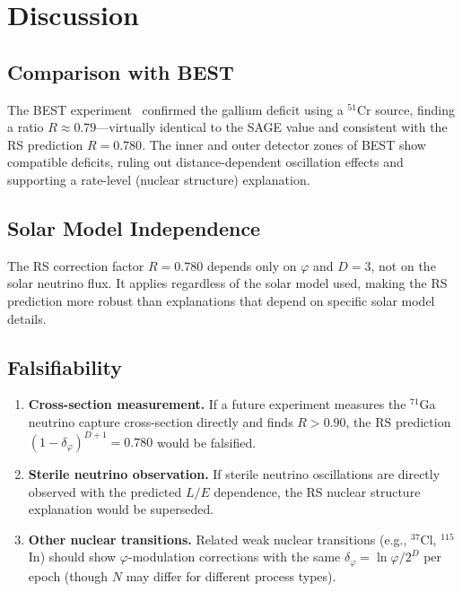 \documentclass[12pt,a4paper]{article}
\theoremstyle{definition}
\theoremstyle{remark}
\begin{document}
\section{Discussion}
\label{sec:discuss}

\subsection{Comparison with BEST}

The BEST experiment~\cite{BEST2022} confirmed the gallium deficit using
a $^{51}$Cr source, finding a ratio $R \approx 0.79$---virtually
identical to the SAGE value and consistent with the RS prediction
$R = 0.780$.  The inner and outer detector zones of BEST show
compatible deficits, ruling out distance-dependent oscillation effects
and supporting a rate-level (nuclear structure) explanation.

\subsection{Solar Model Independence}

The RS correction factor $R = 0.780$ depends only on $\varphi$ and
$D = 3$, not on the solar neutrino flux.  It applies regardless of the
solar model used, making the RS prediction more robust than explanations
that depend on specific solar model details.

\subsection{Falsifiability}

\begin{enumerate}
  \item \textbf{Cross-section measurement.}  If a future experiment
  measures the $^{71}$Ga neutrino capture cross-section directly and
  finds $R > 0.90$, the RS prediction $(1-\delta_\varphi)^{D+1} =
  0.780$ would be falsified.

  \item \textbf{Sterile neutrino observation.}  If sterile neutrino
  oscillations are directly observed with the predicted $L/E$
  dependence, the RS nuclear structure explanation would be superseded.

  \item \textbf{Other nuclear transitions.}  Related weak nuclear
  transitions (e.g., $^{37}$Cl, $^{115}$In) should show
  $\varphi$-modulation corrections with the same
  $\delta_\varphi = \ln\varphi/2^D$ per epoch (though $N$ may
  differ for different process types).
\end{enumerate}
\end{document}
